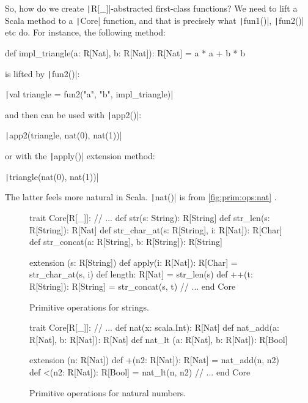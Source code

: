 \documentclass[11pt]{article}
\renewcommand{\vref}[1]{\autoref{#1} \vpageref{#1}}{}
\newcommand{\ScalaI}[1]{\texttt|#1|}
\begin{document}
So, how do we create \ScalaI{R[_]}-abstracted first-class functions? We need to lift a Scala method to a \ScalaI{Core} function, and that is precisely what \ScalaI{fun1()}, \ScalaI{fun2()} etc do. For instance, the following method:

\begin{ScalaBlockSimple}
def impl_triangle(a: R[Nat], b: R[Nat]): R[Nat] =
  a * a + b * b
\end{ScalaBlockSimple}

\noindent is lifted by \ScalaI{fun2()}:

\ScalaI{val triangle = fun2("a", "b", impl_triangle)}

\noindent and then can be used with \ScalaI{app2()}:

\ScalaI{app2(triangle, nat(0), nat(1))}

\noindent or with the \ScalaI{apply()} extension method:

\ScalaI{triangle(nat(0), nat(1))}

\noindent The latter feels more natural in Scala. \ScalaI{nat()} is from \vref{fig:prim:ops:nat}.

\begin{figure}[t]
\begin{ScalaBlock}
trait Core[R[_]]:
  // ...
  def str(s: String): R[String]
  def str_len(s: R[String]): R[Nat]
  def str_char_at(s: R[String], i: R[Nat]): R[Char]
  def str_concat(a: R[String], b: R[String]): R[String]
  
  extension (s: R[String])
    def apply(i: R[Nat]): R[Char] = str_char_at(s, i)
    def length: R[Nat] = str_len(s)
    def ++(t: R[String]): R[String] = str_concat(s, t)
  // ...
end Core
\end{ScalaBlock}
\caption{Primitive operations for strings.}
\label{fig:prim:ops:str}
\hrulefill
\end{figure}

\begin{figure}[tb]
\begin{ScalaBlock}
trait Core[R[_]]:
  // ...
  def nat(x: scala.Int): R[Nat]
  def nat_add(a: R[Nat], b: R[Nat]): R[Nat]
  def nat_lt (a: R[Nat], b: R[Nat]): R[Bool]
  
  extension (n: R[Nat])
    def +(n2: R[Nat]): R[Nat] = nat_add(n, n2)
    def <(n2: R[Nat]): R[Bool] = nat_lt(n, n2)
  // ...
end Core
\end{ScalaBlock}
\caption{Primitive operations for natural numbers.}
\label{fig:prim:ops:nat}
\hrulefill
\end{figure}
\end{document}

